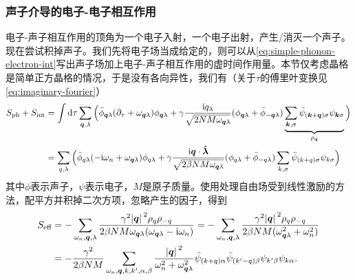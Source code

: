 \subsubsection{声子介导的电子-电子相互作用}

电子-声子相互作用的顶角为一个电子入射，一个电子出射，产生/消灭一个声子。
现在尝试积掉声子。我们先将电子场当成给定的，则可以从\eqref{eq:simple-phonon-electron-int}写出声子场加上电子-声子相互作用的虚时间作用量。本节仅考虑晶格是简单正方晶格的情况，于是没有各向异性，我们有（关于$\tau$的傅里叶变换见\eqref{eq:imaginary-fourier}）
\[
    \begin{aligned}
        S_\text{ph} + S_\text{int} &= \int \dd{\tau} \sum_{\vb*{q}, \lambda} \Big(
        \bar{\phi}_{\vb*{q} \lambda} (\partial_\tau + \omega_{\vb*{q} \lambda}) \phi_{\vb*{q} \lambda}
        + \gamma \frac{\mathrm{i} q_\lambda}{\sqrt{2 N M \omega_{\vb*{q} \lambda}}} (\phi_{\vb*{q} \lambda} + \bar{\phi}_{-\vb*{q} \lambda}) \underbrace{\sum_{\vb*{k}, \sigma} \bar{\psi}_{(\vb*{k} + \vb*{q}) \sigma} \psi_{\vb*{k} \sigma}}_{\rho_{\vb*{q}}}
        \Big) \\
        &= \sum_{{q}, \lambda} \Big(
            \bar{\phi}_{{q} \lambda} (- \mathrm{i} \omega_n + \omega_{\vb*{q} \lambda}) \phi_{{q} \lambda}
            + \gamma \frac{\mathrm{i} \vb*{q} \cdot \vu*{\lambda}}{\sqrt{2 \beta N M \omega_{\vb*{q} \lambda}}} (\phi_{{q} \lambda} + \bar{\phi}_{-{q} \lambda}) \sum_{{k}, \sigma} \bar{\psi}_{({k} + {q}) \sigma} \psi_{{k} \sigma}
        \Big)
    \end{aligned}
\]
其中$\phi$表示声子，$\psi$表示电子，$M$是原子质量。使用处理自由场受到线性激励的方法，配平方并积掉二次方项，忽略产生的因子，得到
\begin{equation}
    \begin{aligned}
        S_\text{eff} &= - \sum_{\omega_n, \vb*{q}, \lambda} \frac{\gamma^2 \abs*{\vb*{q}}^2 \rho_{{q}} \rho_{-{q}}}{2 \beta N M \omega_{\vb*{q} \lambda} (\omega_{\vb*{q} \lambda} - \mathrm{i} \omega_n)} 
        = - \sum_{\omega_n, \vb*{q}, \lambda} \frac{\gamma^2 \abs*{\vb*{q}}^2 \rho_{{q}} \rho_{-{q}}}{2 \beta N M (\omega_{\vb*{q} \lambda}^2 + \omega_n^2)} \\ 
        &= - \frac{\gamma^2}{2 \beta N M} \sum_{\omega_n, \vb*{q}, {k}, {k}', \alpha, \beta} \frac{\abs*{\vb*{q}}^2}{\omega_n^2 + \omega_{\vb*{q} \lambda}^2} \bar{\psi}_{({k}+{q}) \alpha} \bar{\psi}_{({k}' - {q}) \beta} \psi_{{k}' \beta} \psi_{{k} \alpha} .
    \end{aligned}
    \label{eq:retarded-two-electron}
\end{equation}
